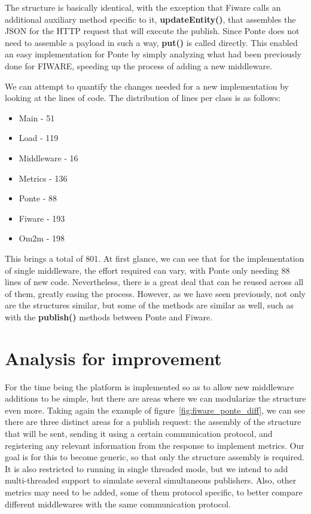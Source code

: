 \documentclass[conference]{IEEEtran}
\begin{document}
The structure is basically identical, with the exception that Fiware calls an additional auxiliary method specific to it, \textbf{updateEntity()}, that assembles the JSON for the HTTP request that will execute the publish. Since Ponte does not need to assemble a payload in such a way, \textbf{put()} is called directly. This enabled an easy implementation for Ponte by simply analyzing what had been previously done for FIWARE, speeding up the process of adding a new middleware.

We can attempt to quantify the changes needed for a new implementation by looking at the lines of code. The distribution of lines per class is as follows:
\begin{itemize}
\item Main - 51
\item Load - 119
\item Middleware - 16
\item Metrics - 136
\item Ponte - 88
\item Fiware - 193
\item Om2m - 198
\end{itemize}
This brings a total of 801. At first glance, we can see that for the implementation of single middleware, the effort required can vary, with Ponte only needing 88 lines of new code. Nevertheless, there is a great deal that can be reused across all of them, greatly easing the process. However, as we have seen previously, not only are the structures similar, but some of the methods are similar as well, such as with the \textbf{publish()} methods between Ponte and Fiware.

\section{Analysis for improvement}

For the time being the platform is implemented so as to allow new middleware additions to be simple, but there are areas where we can modularize the structure even more. Taking again the example of figure~\ref{fig:fiware_ponte_diff}, we can see there are three distinct areas for a publish request: the assembly of the structure that will be sent, sending it using a certain communication protocol, and registering any relevant information from the response to implement metrics. Our goal is for this to become generic, so that only the structure assembly is required. It is also restricted to running in single threaded mode, but we intend to add multi-threaded support to simulate several simultaneous publishers. Also, other metrics may need to be added, some of them protocol specific, to better compare different middlewares with the same communication protocol. 
\end{document}
